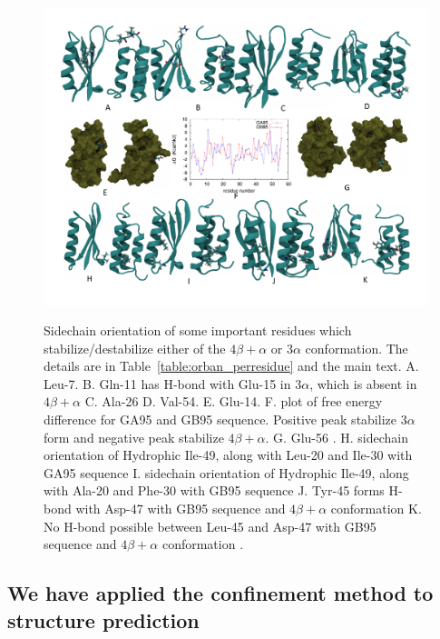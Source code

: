 \documentclass[12pt]{article}
\begin{document}
\begin{figure}
\includegraphics[width=6.4 in,height=5.3 in]{orban_full.pdf}
\label{fig:orban_full}
\caption{Sidechain orientation of some important residues which stabilize/destabilize either of the $4 \beta + \alpha$ or $3 \alpha$ conformation.
The details are in Table~\ref{table:orban_perresidue} and the main text.
A. Leu-7.
B. Gln-11 has H-bond with Glu-15 in $3 \alpha$, which is absent in $4 \beta + \alpha$
C. Ala-26
D. Val-54.
E. Glu-14.
F. plot of free energy difference for GA95 and GB95 sequence. Positive peak stabilize $3 \alpha$ form and negative peak
stabilize $4 \beta + \alpha$.
G. Glu-56 .
H. sidechain orientation of Hydrophic Ile-49, along with Leu-20 and Ile-30 with GA95 sequence
I. sidechain orientation of Hydrophic Ile-49, along with Ala-20 and Phe-30 with GB95 sequence
J. Tyr-45 forms H-bond with Asp-47 with GB95 sequence and $4 \beta + \alpha$ conformation
K. No H-bond possible between Leu-45 and Asp-47 with GB95 sequence and $4 \beta + \alpha$ conformation .}
\end{figure}


\subsection{We have applied the confinement method to structure prediction}
\end{document}
